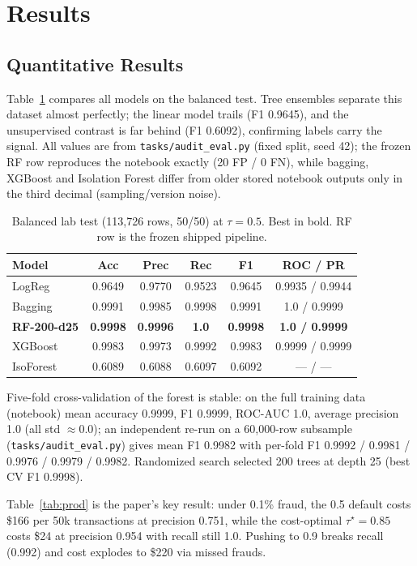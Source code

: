 \documentclass[conference]{IEEEtran}
\begin{document}
\section{Results}
\subsection{Quantitative Results}
Table~\ref{tab:baselines} compares all models on the balanced test.
Tree ensembles separate this dataset almost perfectly; the linear
model trails (F1 0.9645), and the unsupervised contrast is far behind
(F1 0.6092), confirming labels carry the signal. All values are from
\texttt{tasks/audit\_eval.py} (fixed split, seed 42); the frozen RF
row reproduces the notebook exactly (20 FP / 0 FN), while bagging,
XGBoost and Isolation Forest differ from older stored notebook
outputs only in the third decimal (sampling/version noise).

\begin{table}[htbp]
\caption{Balanced lab test (113,726 rows, 50/50) at $\tau=0.5$. Best
in bold. RF row is the frozen shipped pipeline.}
\label{tab:baselines}
\begin{center}
\begin{tabular}{lccccc}
\toprule
Model & Acc & Prec & Rec & F1 & ROC / PR \\
\midrule
LogReg & 0.9649 & 0.9770 & 0.9523 & 0.9645 & 0.9935 / 0.9944 \\
Bagging & 0.9991 & 0.9985 & 0.9998 & 0.9991 & 1.0 / 0.9999 \\
\textbf{RF-200-d25} & \textbf{0.9998} & \textbf{0.9996} & \textbf{1.0} &
\textbf{0.9998} & \textbf{1.0 / 0.9999} \\
XGBoost & 0.9983 & 0.9973 & 0.9992 & 0.9983 & 0.9999 / 0.9999 \\
IsoForest & 0.6089 & 0.6088 & 0.6097 & 0.6092 & --- / --- \\
\bottomrule
\end{tabular}
\end{center}
\end{table}

Five-fold cross-validation of the forest is stable: on the full
training data (notebook) mean accuracy 0.9999, F1 0.9999, ROC-AUC
1.0, average precision 1.0 (all std $\approx$0.0); an independent
re-run on a 60,000-row subsample (\texttt{tasks/audit\_eval.py})
gives mean F1 0.9982 with per-fold F1 0.9992 / 0.9981 / 0.9976 /
0.9979 / 0.9982. Randomized search selected 200 trees at depth 25
(best CV F1 0.9998).

Table~\ref{tab:prod} is the paper's key result: under 0.1\% fraud,
the 0.5 default costs \$166 per 50k transactions at precision 0.751,
while the cost-optimal $\tau^\star=0.85$ costs \$24 at precision
0.954 with recall still 1.0. Pushing to 0.9 breaks recall (0.992) and
cost explodes to \$220 via missed frauds.
\end{document}

